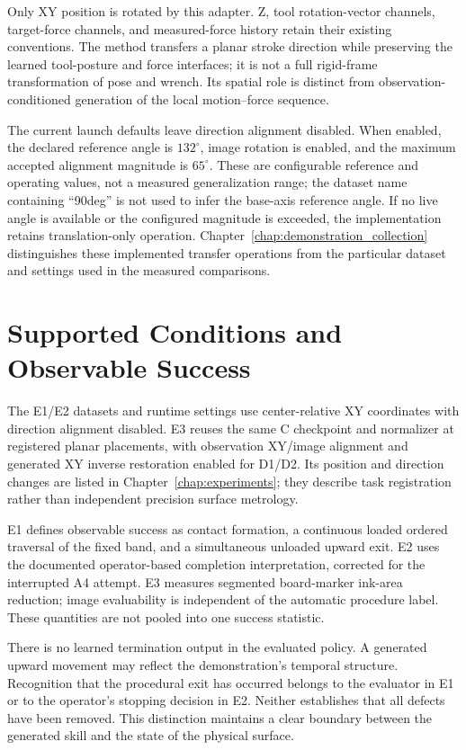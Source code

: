 Only XY position is rotated by this adapter. Z, tool rotation-vector channels, target-force channels, and measured-force history retain their existing conventions. The method transfers a planar stroke direction while preserving the learned tool-posture and force interfaces; it is not a full rigid-frame transformation of pose and wrench. Its spatial role is distinct from observation-conditioned generation of the local motion--force sequence.

The current launch defaults leave direction alignment disabled. When enabled, the declared reference angle is \(132^\circ\), image rotation is enabled, and the maximum accepted alignment magnitude is \(65^\circ\). These are configurable reference and operating values, not a measured generalization range; the dataset name containing ``90deg'' is not used to infer the base-axis reference angle. If no live angle is available or the configured magnitude is exceeded, the implementation retains translation-only operation. Chapter~\ref{chap:demonstration_collection} distinguishes these implemented transfer operations from the particular dataset and settings used in the measured comparisons.

\section{Supported Conditions and Observable Success}
The E1/E2 datasets and runtime settings use center-relative XY coordinates with direction alignment disabled. E3 reuses the same C checkpoint and normalizer at registered planar placements, with observation XY/image alignment and generated XY inverse restoration enabled for D1/D2. Its position and direction changes are listed in Chapter~\ref{chap:experiments}; they describe task registration rather than independent precision surface metrology.

E1 defines observable success as contact formation, a continuous loaded ordered traversal of the fixed band, and a simultaneous unloaded upward exit. E2 uses the documented operator-based completion interpretation, corrected for the interrupted A4 attempt. E3 measures segmented board-marker ink-area reduction; image evaluability is independent of the automatic procedure label. These quantities are not pooled into one success statistic.

There is no learned termination output in the evaluated policy. A generated upward movement may reflect the demonstration's temporal structure. Recognition that the procedural exit has occurred belongs to the evaluator in E1 or to the operator's stopping decision in E2. Neither establishes that all defects have been removed. This distinction maintains a clear boundary between the generated skill and the state of the physical surface.
